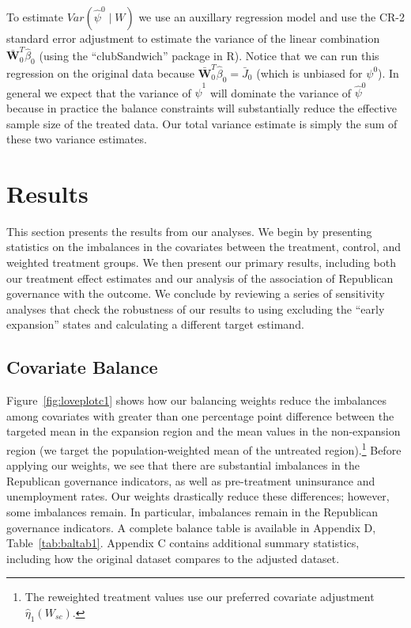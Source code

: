 \documentclass[aoas]{imsart}
\theoremstyle{plain}
\newcommand{\matr}[1]{\mathbf{#1}} %
\theoremstyle{remark}
\begin{document}
To estimate $Var(\hat{\psi}^0 \mid W)$ we use an auxillary regression model and use the CR-2 standard error adjustment to estimate the variance of the linear combination $\bar{\matr{W}}_0^T\hat{\beta}_0$ (using the ``clubSandwich'' package in R). Notice that we can run this regression on the original data because $\bar{\matr{W}}_0^T\hat{\beta}_0 = \bar{J}_0$ (which is unbiased for $\psi^0$). In general we expect that the variance of $\hat{\psi}^1$ will dominate the variance of $\hat{\psi}^0$ because in practice the balance constraints will substantially reduce the effective sample size of the treated data. Our total variance estimate is simply the sum of these two variance estimates.

\section{Results}

This section presents the results from our analyses. We begin by presenting statistics on the imbalances in the covariates between the treatment, control, and weighted treatment groups. We then present our primary results, including both our treatment effect estimates and our analysis of the association of Republican governance with the outcome. We conclude by reviewing a series of sensitivity analyses that check the robustness of our results to using excluding the ``early expansion'' states and calculating a different target estimand.

\subsection{Covariate Balance}

Figure~\ref{fig:loveplotc1} shows how our balancing weights reduce the imbalances among covariates with greater than one percentage point difference between the targeted mean in the expansion region and the mean values in the non-expansion region (we target the population-weighted mean of the untreated region).\footnote{The reweighted treatment values use our preferred covariate adjustment $\hat{\eta}_1(W_{sc})$.} Before applying our weights, we see that there are substantial imbalances in the Republican governance indicators, as well as pre-treatment uninsurance and unemployment rates. Our weights drastically reduce these differences; however, some imbalances remain. In particular, imbalances remain in the Republican governance indicators. A complete balance table is available in Appendix D, Table~\ref{tab:baltab1}. Appendix C contains additional summary statistics, including how the original dataset compares to the adjusted dataset. 
\end{document}
